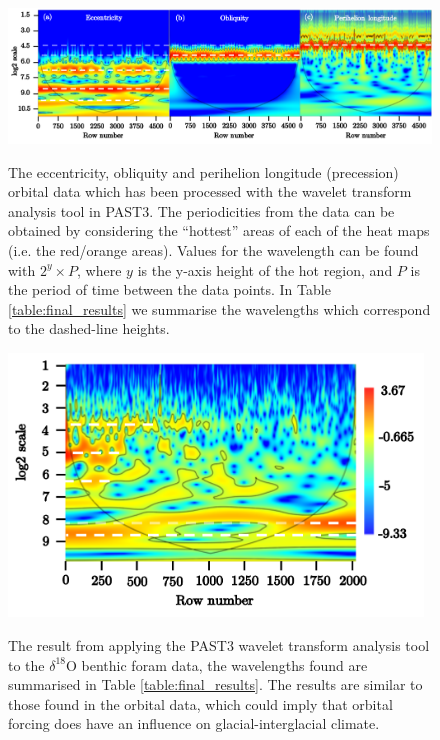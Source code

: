 \documentclass[12pt, onecolumn]{revtex4}    %
\begin{document}
\begin{figure}[!h]
\begin{center}
\includegraphics[width=16cm]{figures/wa_orbital_data}
\caption[]{The eccentricity, obliquity and perihelion longitude (precession) orbital data which has been processed with the wavelet transform analysis tool in PAST3. The periodicities from the data can be obtained by considering the ``hottest'' areas of each of the heat maps (i.e. the red/orange areas). Values for the wavelength can be found with $2^y \times P$, where $y$ is the y-axis height of the hot region, and $P$ is the period of time between the data points. In Table \ref{table:final_results} we summarise the wavelengths which correspond to the dashed-line heights.}
\vspace{-3ex}
\label{fig:wa_orbital_data}
\end{center}
\end{figure}

\begin{figure}[!h]
\begin{center}
\includegraphics[width=11cm]{figures/wa_d18O.pdf}
\caption[]{The result from applying the PAST3 wavelet transform analysis tool to the $\delta^{18}$O benthic foram data, the wavelengths found are summarised in Table \ref{table:final_results}. The results are similar to those found in the orbital data, which could imply that orbital forcing does have an influence on glacial-interglacial climate.}
\vspace{-3ex}
\label{fig:wa_d18o}
\end{center}
\end{figure}
\end{document}
